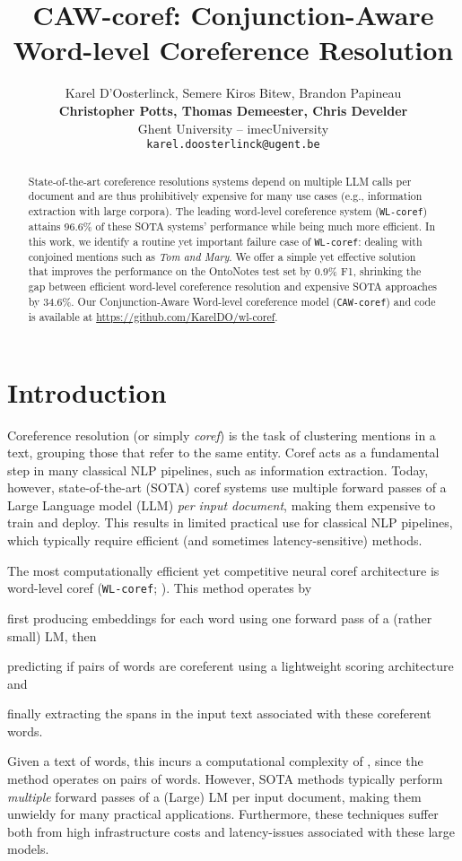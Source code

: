 \documentclass[11pt]{article}
\title{\emojicaw CAW-coref: Conjunction-Aware Word-level Coreference Resolution}
\author{Karel D'Oosterlinck, Semere Kiros Bitew, Brandon Papineau \\ \textbf{Christopher Potts, Thomas Demeester, Chris Develder} \\
  Ghent University -- imec\qquadStanford University  \\
  \texttt{karel.doosterlinck@ugent.be}
}
\newcommand\wlcoref{{\texttt{WL-coref}}}
\newcommand\cawcoref{{\texttt{CAW-coref}}}
\begin{document}
\maketitle

\begin{abstract}
State-of-the-art coreference resolutions systems depend on multiple LLM calls per document and are thus prohibitively expensive for many use cases (e.g., information extraction with large corpora). The leading word-level coreference system (\wlcoref{}) attains 96.6\% of these SOTA systems' performance while being much more efficient. In this work, we identify a routine yet important 
failure case of \wlcoref{}: dealing with conjoined mentions such as \emph{Tom and Mary}. 
We offer a simple yet effective solution that improves the performance on the OntoNotes test set by 0.9\% F1, shrinking the gap between efficient word-level coreference resolution and expensive SOTA approaches by 34.6\%. Our Conjunction-Aware Word-level coreference model (\cawcoref{}) and code is available at \url{https://github.com/KarelDO/wl-coref}.

\end{abstract}


\section{Introduction}


Coreference resolution (or simply \textit{coref}) is the task of clustering mentions in a text, grouping those that refer to the same entity. Coref acts as a fundamental step in many classical NLP pipelines, such as information extraction. Today, however, state-of-the-art (SOTA) coref systems use multiple forward passes of a Large Language model (LLM) \textit{per input document}, making them expensive to train and deploy. This results in limited practical use for classical NLP pipelines, which typically require efficient (and sometimes latency-sensitive) methods.

The most computationally efficient yet competitive neural coref architecture is word-level coref (\wlcoref{}; \citealp{dobrovolskii-2021-word}). 
This method operates by 
\begin{enumerate*}[(i)]
    \item first producing embeddings for each word using one forward pass of a (rather small) LM, then
    \item predicting if pairs of words are coreferent using a lightweight scoring architecture and
    \item finally extracting the 
    spans in the input text associated with these coreferent words.
\end{enumerate*}
Given a text of  words, this incurs a computational complexity of , since the method operates on pairs of words. However, SOTA methods typically perform \emph{multiple} forward passes of a (Large) LM per input document, making them unwieldy for many practical applications. Furthermore, these techniques suffer both from high infrastructure costs and latency-issues associated with these large models.
\end{document}
